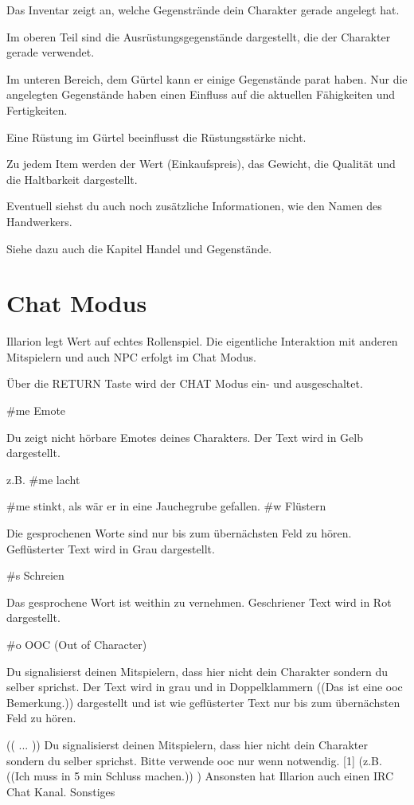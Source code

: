 \documentclass[a4paper,11pt]{book}
\begin{document}
Das Inventar zeigt an, welche Gegenstrände dein Charakter gerade angelegt hat.

Im oberen Teil sind die Ausrüstungsgegenstände dargestellt, die der Charakter gerade verwendet.

Im unteren Bereich, dem Gürtel kann er einige Gegenstände parat haben. Nur die angelegten Gegenstände haben einen Einfluss auf die aktuellen Fähigkeiten und Fertigkeiten.

Eine Rüstung im Gürtel beeinflusst die Rüstungsstärke nicht.

Zu jedem Item werden der Wert (Einkaufspreis), das Gewicht, die Qualität und die Haltbarkeit dargestellt.

Eventuell siehst du auch noch zusätzliche Informationen, wie den Namen des Handwerkers.

Siehe dazu auch die Kapitel Handel und Gegenstände.

\section{Chat Modus}

Illarion legt Wert auf echtes Rollenspiel. Die eigentliche Interaktion mit anderen Mitspielern und auch NPC erfolgt im Chat Modus.

Über die RETURN Taste wird der CHAT Modus ein- und ausgeschaltet.

\#me  Emote

Du zeigt nicht hörbare Emotes deines Charakters. Der Text wird in Gelb dargestellt.

z.B.  \#me lacht

 \#me stinkt, als wär er in eine Jauchegrube gefallen. \#w  Flüstern

Die gesprochenen Worte sind nur bis zum übernächsten Feld zu hören. Geflüsterter Text wird in Grau dargestellt.

\#s  Schreien

Das gesprochene Wort ist weithin zu vernehmen. Geschriener Text wird in Rot dargestellt.

\#o  OOC (Out of Character)

Du signalisierst deinen Mitspielern, dass hier nicht dein Charakter sondern du selber sprichst. Der Text wird in grau und in Doppelklammern ((Das ist eine ooc Bemerkung.)) dargestellt und ist wie geflüsterter Text nur bis zum übernächsten Feld zu hören.

(( ... )) Du signalisierst deinen Mitspielern, dass hier nicht dein Charakter sondern du selber sprichst. Bitte verwende ooc nur wenn notwendig. [1] (z.B. ((Ich muss in 5 min Schluss machen.)) ) Ansonsten hat Illarion auch einen IRC Chat Kanal. Sonstiges
\end{document}

